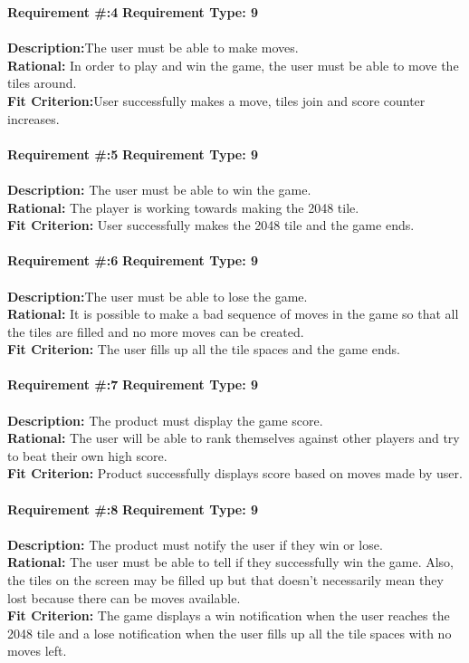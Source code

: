 \textbf {Requirement \#:4} \indent\textbf {Requirement Type: 9}\\\\
\textbf {Description:}The user must be able to make moves. \\
\textbf {Rational:} In order to play and win the game, the user must be able to move the tiles around. \\
\textbf {Fit Criterion:}User successfully makes a move, tiles join and score counter increases. \\\\

\textbf {Requirement \#:5} \indent\textbf {Requirement Type: 9} \\\\
\textbf {Description:} The user must be able to win the game.\\
\textbf {Rational:} The player is working towards making the 2048 tile. \\
\textbf {Fit Criterion:} User successfully makes the 2048 tile and the game ends. \\\\

\textbf {Requirement \#:6} \indent\textbf {Requirement Type: 9}\\\\
\textbf {Description:}The user must be able to lose the game. \\
\textbf {Rational:} It is possible to make a bad sequence of moves in the game so that all the tiles are filled and 
no more moves can be created.\\
\textbf {Fit Criterion:} The user fills up all the tile spaces and the game ends.\\\\

\textbf {Requirement \#:7} \indent\textbf {Requirement Type: 9} \\\\
\textbf {Description:} The product must display the game score.\\
\textbf {Rational:} The user will be able to rank themselves against other players and try to beat their own high 
score.\\
\textbf {Fit Criterion:} Product successfully displays score based on moves made by user.\\\\

\textbf {Requirement \#:8} \indent\textbf {Requirement Type: 9} \\\\
\textbf {Description:} The product must notify the user if they win or 
lose.\\
\textbf {Rational:} The user must be able to tell if they successfully win the game. Also, the tiles on the screen 
may be filled up but that doesn't necessarily mean they lost because there can be moves available. \\
\textbf {Fit Criterion:} The game displays a win notification when the user reaches the 2048 tile and a lose 
notification when the user fills up all the tile spaces with no moves left. \\\\

